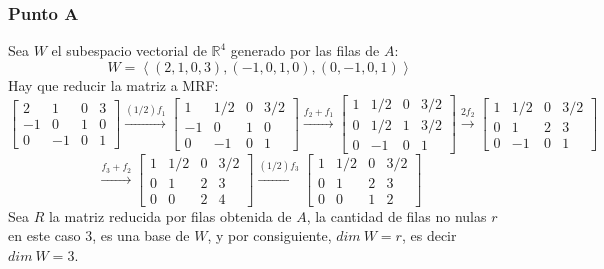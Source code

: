 \documentclass[a4paper,12pt]{article}
\begin{document}
\subsubsection{Punto A}
Sea $W$ el subespacio vectorial de $\mathds{R}^4$ generado por las filas de $A$:
$$W=\left \langle (2,1,0,3), (-1,0,1,0), (0,-1,0,1) \right \rangle$$
Hay que reducir la matriz a MRF:
$$
\begin{bmatrix}
2 & 1 & 0 & 3\\ 
-1 & 0 & 1 & 0\\ 
0 & -1 & 0 & 1
\end{bmatrix}
\xrightarrow[]{(1/2)f_1}
\begin{bmatrix}
1 & 1/2 & 0 & 3/2\\ 
-1 & 0 & 1 & 0\\ 
0 & -1 & 0 & 1
\end{bmatrix}
\xrightarrow[]{f_2+f_1}
\begin{bmatrix}
1 & 1/2 & 0 & 3/2\\ 
0 & 1/2 & 1 & 3/2\\ 
0 & -1 & 0 & 1
\end{bmatrix}
\xrightarrow[]{2f_2}
\begin{bmatrix}
1 & 1/2 & 0 & 3/2\\ 
0 & 1 & 2 & 3\\ 
0 & -1 & 0 & 1
\end{bmatrix}
$$
$$
\xrightarrow[]{f_3+f_2}
\begin{bmatrix}
1 & 1/2 & 0 & 3/2\\ 
0 & 1 & 2 & 3\\ 
0 & 0 & 2 & 4
\end{bmatrix}
\xrightarrow[]{(1/2)f_3}
\begin{bmatrix}
1 & 1/2 & 0 & 3/2\\ 
0 & 1 & 2 & 3\\ 
0 & 0 & 1 & 2
\end{bmatrix}
$$
Sea $R$ la matriz reducida por filas obtenida de $A$, la cantidad de filas no nulas $r$ en este caso $3$, es una base de $W$, y por consiguiente, $dim \ W = r$, es decir $dim \ W = 3$.
\end{document}
